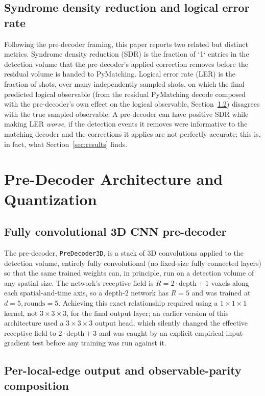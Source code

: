 \documentclass[conference]{IEEEtran}
\begin{document}
\subsection{Syndrome density reduction and logical error rate}
Following the pre-decoder framing, this paper reports two related but distinct metrics. Syndrome density reduction (SDR) is the fraction of `1` entries in the detection volume that the pre-decoder's applied correction removes before the residual volume is handed to PyMatching. Logical error rate (LER) is the fraction of shots, over many independently sampled shots, on which the final predicted logical observable (from the residual PyMatching decode composed with the pre-decoder's own effect on the logical observable, Section~\ref{subsec:arch-edges}) disagrees with the true sampled observable. A pre-decoder can have positive SDR while making LER \emph{worse}, if the detection events it removes were informative to the matching decoder and the corrections it applies are not perfectly accurate; this is, in fact, what Section~\ref{sec:results} finds.

\section{Pre-Decoder Architecture and Quantization}
\label{sec:architecture}

\subsection{Fully convolutional 3D CNN pre-decoder}
\label{subsec:arch-predecoder}

The pre-decoder, \texttt{PreDecoder3D}, is a stack of 3D convolutions applied to the detection volume, entirely fully convolutional (no fixed-size fully connected layers) so that the same trained weights can, in principle, run on a detection volume of any spatial size. The network's receptive field is \(R = 2 \cdot \text{depth} + 1\) voxels along each spatial-and-time axis, so a depth-2 network has \(R=5\) and was trained at \(d=5, \text{rounds}=5\). Achieving this exact relationship required using a \(1\times1\times1\) kernel, not \(3\times3\times3\), for the final output layer; an earlier version of this architecture used a \(3\times3\times3\) output head, which silently changed the effective receptive field to \(2\cdot\text{depth}+3\) and was caught by an explicit empirical input-gradient test before any training was run against it.

\subsection{Per-local-edge output and observable-parity composition}
\label{subsec:arch-edges}
\end{document}
